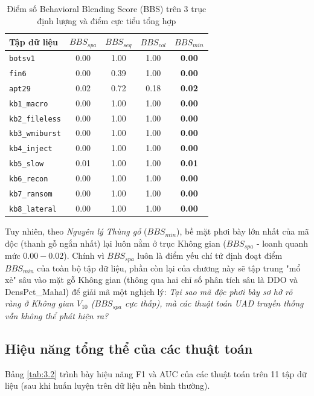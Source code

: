 \documentclass[../main.tex]{subfiles}
\begin{document}
\begin{table}[H]
\centering
\small
\caption{Điểm số Behavioral Blending Score (BBS) trên 3 trục định lượng và điểm cực tiểu tổng hợp}
\label{tab:bbs_3_axis}
\begin{tabular}{|l|c|c|c|c|}
\hline
\textbf{Tập dữ liệu} & \textbf{$BBS_{spa}$} & \textbf{$BBS_{seq}$} & \textbf{$BBS_{col}$} & \textbf{$BBS_{min}$} \\ \hline
\texttt{botsv1} & 0.00 & 1.00 & 1.00 & \textbf{0.00} \\ \hline
\texttt{fin6} & 0.00 & 0.39 & 1.00 & \textbf{0.00} \\ \hline
\texttt{apt29} & 0.02 & 0.72 & 0.18 & \textbf{0.02} \\ \hline
\texttt{kb1\_macro} & 0.00 & 1.00 & 1.00 & \textbf{0.00} \\ \hline
\texttt{kb2\_fileless} & 0.00 & 1.00 & 1.00 & \textbf{0.00} \\ \hline
\texttt{kb3\_wmiburst} & 0.00 & 1.00 & 1.00 & \textbf{0.00} \\ \hline
\texttt{kb4\_inject} & 0.00 & 1.00 & 1.00 & \textbf{0.00} \\ \hline
\texttt{kb5\_slow} & 0.01 & 1.00 & 1.00 & \textbf{0.01} \\ \hline
\texttt{kb6\_recon} & 0.00 & 1.00 & 1.00 & \textbf{0.00} \\ \hline
\texttt{kb7\_ransom} & 0.00 & 1.00 & 1.00 & \textbf{0.00} \\ \hline
\texttt{kb8\_lateral} & 0.00 & 1.00 & 1.00 & \textbf{0.00} \\ \hline
\end{tabular}
\end{table}

Tuy nhiên, theo \textit{Nguyên lý Thùng gỗ} ($BBS_{min}$), bề mặt phơi bày lớn nhất của mã độc (thanh gỗ ngắn nhất) lại luôn nằm ở trục Không gian ($BBS_{spa}$ - loanh quanh mức $0.00 - 0.02$). Chính vì $BBS_{spa}$ luôn là điểm yếu chí tử định đoạt điểm $BBS_{min}$ của toàn bộ tập dữ liệu, phần còn lại của chương này sẽ tập trung "mổ xẻ" sâu vào mặt gỗ Không gian (thông qua hai chỉ số phân tích sâu là DDO và DensPct\_Mahal) để giải mã một nghịch lý: \textit{Tại sao mã độc phơi bày sơ hở rõ ràng ở Không gian $V_{10}$ ($BBS_{spa}$ cực thấp), mà các thuật toán UAD truyền thống vẫn không thể phát hiện ra?}

\subsection{Hiệu năng tổng thể của các thuật toán}
Bảng \ref{tab:3.2} trình bày hiệu năng F1 và AUC của các thuật toán trên 11 tập dữ liệu (sau khi huấn luyện trên dữ liệu nền bình thường).
\end{document}
